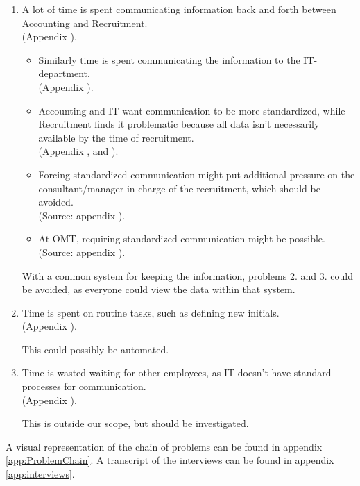 \begin{enumerate}
\item A lot of time is spent communicating information back and forth between Accounting and Recruitment. \\
(Appendix ).
\begin{itemize}
\item Similarly time is spent communicating the information to the IT-department.\\
(Appendix ).
\item Accounting and IT want communication to be more standardized, while Recruitment finds it problematic because all data isn't necessarily available by the time of recruitment.\\
(Appendix ,  and ).
\item Forcing standardized communication might put additional pressure on the consultant/manager in charge of the recruitment, which should be avoided.\\
(Source: appendix ).
\item At OMT, requiring standardized communication might be possible.\\
(Source: appendix ).
\end{itemize}

With a common system for keeping the information, problems 2. and 3. could be avoided, as everyone could view the data within that system.

\item Time is spent on routine tasks, such as defining new initials.\\
(Appendix ).

This could possibly be automated.

\item Time is wasted waiting for other employees, as IT doesn't have standard processes for communication.\\
(Appendix ).

This is outside our scope, but should be investigated.
\end{enumerate}

A visual representation of the chain of problems can be found in appendix \ref{app:ProblemChain}.
A transcript of the interviews can be found in appendix \ref{app:interviews}.

